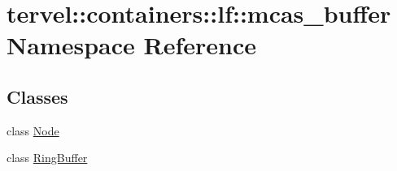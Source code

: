 \hypertarget{namespacetervel_1_1containers_1_1lf_1_1mcas__buffer}{}\section{tervel\+:\+:containers\+:\+:lf\+:\+:mcas\+\_\+buffer Namespace Reference}
\label{namespacetervel_1_1containers_1_1lf_1_1mcas__buffer}
\subsection*{Classes}
\begin{DoxyCompactItemize}
\item 
class \hyperlink{classtervel_1_1containers_1_1lf_1_1mcas__buffer_1_1_node}{Node}
\item 
class \hyperlink{classtervel_1_1containers_1_1lf_1_1mcas__buffer_1_1_ring_buffer}{Ring\+Buffer}
\end{DoxyCompactItemize}
